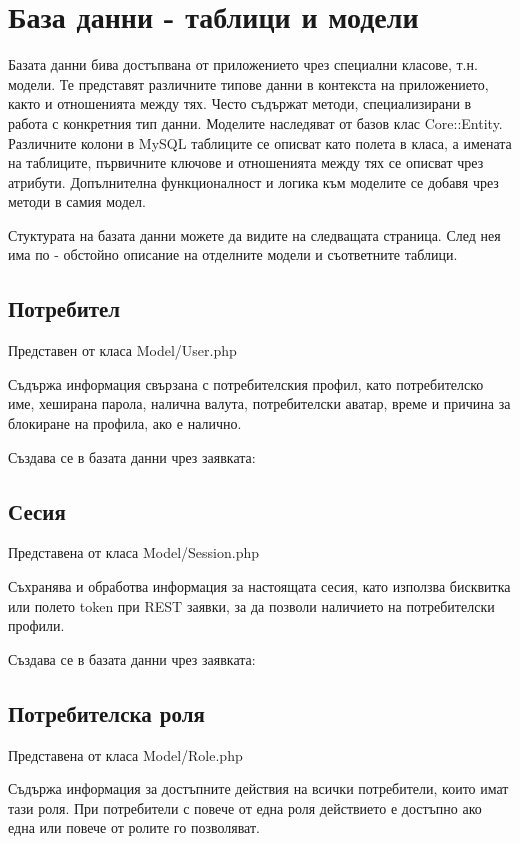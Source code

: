 
\section{База данни -  таблици и модели}
Базата данни бива достъпвана от приложението чрез
специални класове, т.н. модели. Те представят
различните типове данни в контекста на
приложението, както и отношенията между тях. Често
съдържат методи, специализирани в работа с конкретния
тип данни.
Моделите наследяват от базов клас Core::Entity.
Различните колони в MySQL таблиците се описват като
полета в класа, а имената на таблиците, първичните
ключове и отношенията между тях се описват чрез атрибути.
Допълнителна функционалност и логика към моделите се
добавя чрез методи в самия модел.

Стуктурата на базата данни можете да видите на
следващата страница. След нея има по - обстойно
описание на отделните модели и съответните таблици.




\subsection{Потребител}
Представен от класа Model/User.php

Съдържа информация свързана с потребителския профил,
като потребителско име, хеширана парола, налична валута, 
потребителски аватар, време и причина за блокиране
на профила, ако е налично.

Създава се в базата данни чрез заявката:


\subsection{Сесия}
Представена от класа Model/Session.php

Съхранява и обработва информация за настоящата сесия,
като използва бисквитка или полето token при REST заявки,
за да позволи наличието на потребителски профили.

Създава се в базата данни чрез заявката:


\subsection{Потребителска роля}
Представена от класа Model/Role.php

Съдържа информация за достъпните действия на всички
потребители, които имат тази роля.
При потребители с повече от една роля действието е
достъпно ако една или повече от ролите го позволяват.

